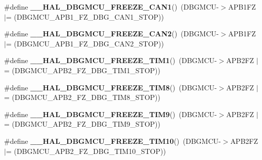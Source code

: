 \begin{DoxyCompactItemize}
\#define {\bfseries \+\_\+\+\_\+\+H\+A\+L\+\_\+\+D\+B\+G\+M\+C\+U\+\_\+\+F\+R\+E\+E\+Z\+E\+\_\+\+C\+A\+N1}()~(D\+B\+G\+M\+CU-\/$>$A\+P\+B1\+FZ $\vert$= (D\+B\+G\+M\+C\+U\+\_\+\+A\+P\+B1\+\_\+\+F\+Z\+\_\+\+D\+B\+G\+\_\+\+C\+A\+N1\+\_\+\+S\+T\+OP))
\item 
\mbox{\label{group___h_a_l___exported___macros_gadb4f2b03a03936de95c1a9f939d452c0}} 
\#define {\bfseries \+\_\+\+\_\+\+H\+A\+L\+\_\+\+D\+B\+G\+M\+C\+U\+\_\+\+F\+R\+E\+E\+Z\+E\+\_\+\+C\+A\+N2}()~(D\+B\+G\+M\+CU-\/$>$A\+P\+B1\+FZ $\vert$= (D\+B\+G\+M\+C\+U\+\_\+\+A\+P\+B1\+\_\+\+F\+Z\+\_\+\+D\+B\+G\+\_\+\+C\+A\+N2\+\_\+\+S\+T\+OP))
\item 
\mbox{\label{group___h_a_l___exported___macros_ga93d7e54d78e5dea068f5f6a94d5f94c7}} 
\#define {\bfseries \+\_\+\+\_\+\+H\+A\+L\+\_\+\+D\+B\+G\+M\+C\+U\+\_\+\+F\+R\+E\+E\+Z\+E\+\_\+\+T\+I\+M1}()~(D\+B\+G\+M\+CU-\/$>$A\+P\+B2\+FZ $\vert$= (D\+B\+G\+M\+C\+U\+\_\+\+A\+P\+B2\+\_\+\+F\+Z\+\_\+\+D\+B\+G\+\_\+\+T\+I\+M1\+\_\+\+S\+T\+OP))
\item 
\mbox{\label{group___h_a_l___exported___macros_gaeee90b698bfc2421155265b4c5b43f09}} 
\#define {\bfseries \+\_\+\+\_\+\+H\+A\+L\+\_\+\+D\+B\+G\+M\+C\+U\+\_\+\+F\+R\+E\+E\+Z\+E\+\_\+\+T\+I\+M8}()~(D\+B\+G\+M\+CU-\/$>$A\+P\+B2\+FZ $\vert$= (D\+B\+G\+M\+C\+U\+\_\+\+A\+P\+B2\+\_\+\+F\+Z\+\_\+\+D\+B\+G\+\_\+\+T\+I\+M8\+\_\+\+S\+T\+OP))
\item 
\mbox{\label{group___h_a_l___exported___macros_ga391a0780e10993d06c519addf582a438}} 
\#define {\bfseries \+\_\+\+\_\+\+H\+A\+L\+\_\+\+D\+B\+G\+M\+C\+U\+\_\+\+F\+R\+E\+E\+Z\+E\+\_\+\+T\+I\+M9}()~(D\+B\+G\+M\+CU-\/$>$A\+P\+B2\+FZ $\vert$= (D\+B\+G\+M\+C\+U\+\_\+\+A\+P\+B2\+\_\+\+F\+Z\+\_\+\+D\+B\+G\+\_\+\+T\+I\+M9\+\_\+\+S\+T\+OP))
\item 
\mbox{\label{group___h_a_l___exported___macros_gaee80dea9c85b61d2fb2499cbd97d8478}} 
\#define {\bfseries \+\_\+\+\_\+\+H\+A\+L\+\_\+\+D\+B\+G\+M\+C\+U\+\_\+\+F\+R\+E\+E\+Z\+E\+\_\+\+T\+I\+M10}()~(D\+B\+G\+M\+CU-\/$>$A\+P\+B2\+FZ $\vert$= (D\+B\+G\+M\+C\+U\+\_\+\+A\+P\+B2\+\_\+\+F\+Z\+\_\+\+D\+B\+G\+\_\+\+T\+I\+M10\+\_\+\+S\+T\+OP))
\item 

\end{DoxyCompactItemize}

